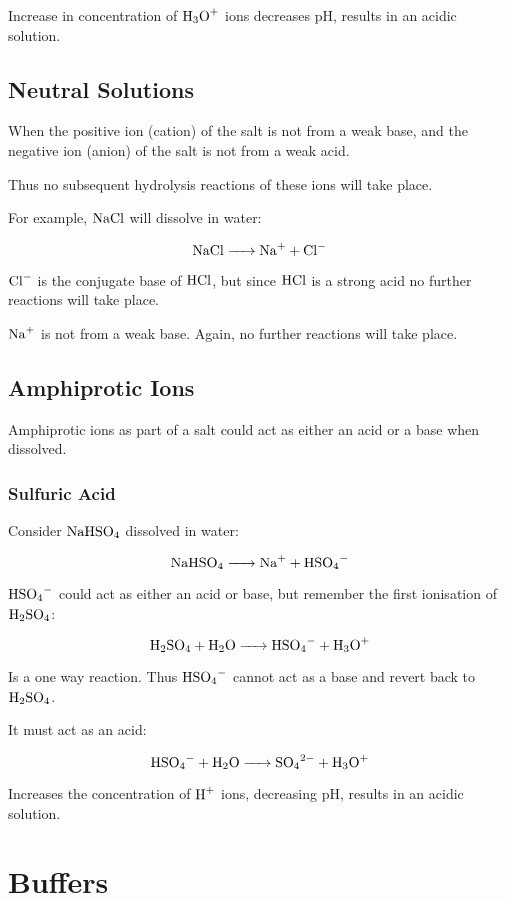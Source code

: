 \documentclass[a4paper,11pt]{article}
\begin{document}
Increase in concentration of $\ce{H3O+}$ ions decreases pH, results in an
acidic solution.


\subsection{Neutral Solutions}

When the positive ion (cation) of the salt is not from a weak base, and the
negative ion (anion) of the salt is not from a weak acid.

Thus no subsequent hydrolysis reactions of these ions will take place.

For example, $\ce{NaCl}$ will dissolve in water:

$$
\ce{NaCl -> Na+ + Cl-}
$$

$\ce{Cl-}$ is the conjugate base of $\ce{HCl}$, but since $\ce{HCl}$ is a strong
acid no further reactions will take place.

$\ce{Na+}$ is not from a weak base. Again, no further reactions will take place.


\subsection{Amphiprotic Ions}

Amphiprotic ions as part of a salt could act as either an acid or a base when
dissolved.


\subsubsection{Sulfuric Acid}

Consider $\ce{NaHSO4}$ dissolved in water:

$$
\ce{NaHSO4 -> Na+ + HSO4-}
$$

$\ce{HSO4-}$ could act as either an acid or base, but remember the first
ionisation of $\ce{H2SO4}$:

$$
\ce{H2SO4 + H2O -> HSO4- + H3O+}
$$

Is a one way reaction. Thus $\ce{HSO4-}$ cannot act as a base and revert back
to $\ce{H2SO4}$.

It must act as an acid:

$$
\ce{HSO4- + H2O -> SO4^2- + H3O+}
$$

Increases the concentration of $\ce{H+}$ ions, decreasing pH, results in an
acidic solution.




\section{Buffers}
\end{document}
